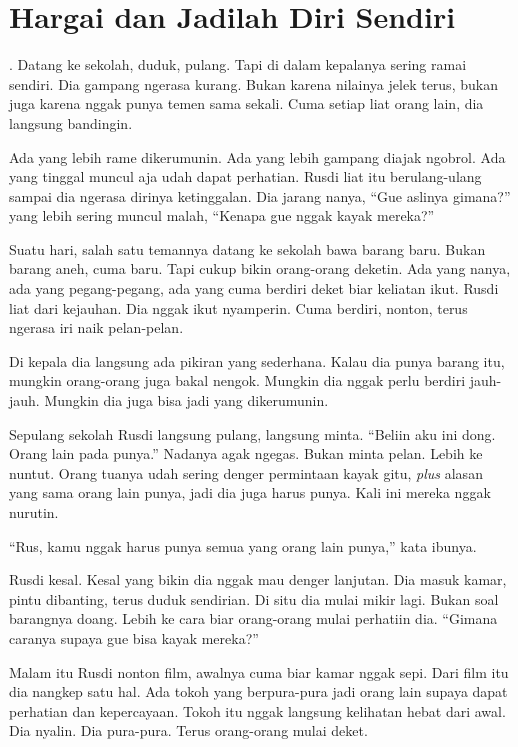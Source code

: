 \chapter*{Hargai dan Jadilah Diri Sendiri}


. Datang ke sekolah, duduk, pulang. Tapi di dalam kepalanya sering ramai sendiri. Dia gampang ngerasa kurang. Bukan karena nilainya jelek terus, bukan juga karena nggak punya temen sama sekali. Cuma setiap liat orang lain, dia langsung bandingin.


Ada yang lebih rame dikerumunin. Ada yang lebih gampang diajak ngobrol. Ada yang tinggal muncul aja udah dapat perhatian. Rusdi liat itu berulang-ulang sampai dia ngerasa dirinya ketinggalan. Dia jarang nanya, ``Gue aslinya gimana?'' yang lebih sering muncul malah, ``Kenapa gue nggak kayak mereka?''


Suatu hari, salah satu temannya datang ke sekolah bawa barang baru. Bukan barang aneh, cuma baru. Tapi cukup bikin orang-orang deketin. Ada yang nanya, ada yang pegang-pegang, ada yang cuma berdiri deket biar keliatan ikut. Rusdi liat dari kejauhan. Dia nggak ikut nyamperin. Cuma berdiri, nonton, terus ngerasa iri naik pelan-pelan.


Di kepala dia langsung ada pikiran yang sederhana. Kalau dia punya barang itu, mungkin orang-orang juga bakal nengok. Mungkin dia nggak perlu berdiri jauh-jauh. Mungkin dia juga bisa jadi yang dikerumunin.


Sepulang sekolah Rusdi langsung pulang, langsung minta. ``Beliin aku ini dong. Orang lain pada punya.'' Nadanya agak ngegas. Bukan minta pelan. Lebih ke nuntut. Orang tuanya udah sering denger permintaan kayak gitu, \textit{plus} alasan yang sama orang lain punya, jadi dia juga harus punya. Kali ini mereka nggak nurutin.

``Rus, kamu nggak harus punya semua yang orang lain punya,'' kata ibunya.


Rusdi kesal. Kesal yang bikin dia nggak mau denger lanjutan. Dia masuk kamar, pintu dibanting, terus duduk sendirian. Di situ dia mulai mikir lagi. Bukan soal barangnya doang. Lebih ke cara biar orang-orang mulai perhatiin dia. ``Gimana caranya supaya gue bisa kayak mereka?''


Malam itu Rusdi nonton film, awalnya cuma biar kamar nggak sepi. Dari film itu dia nangkep satu hal. Ada tokoh yang berpura-pura jadi orang lain supaya dapat perhatian dan kepercayaan. Tokoh itu nggak langsung kelihatan hebat dari awal. Dia nyalin. Dia pura-pura. Terus orang-orang mulai deket.


